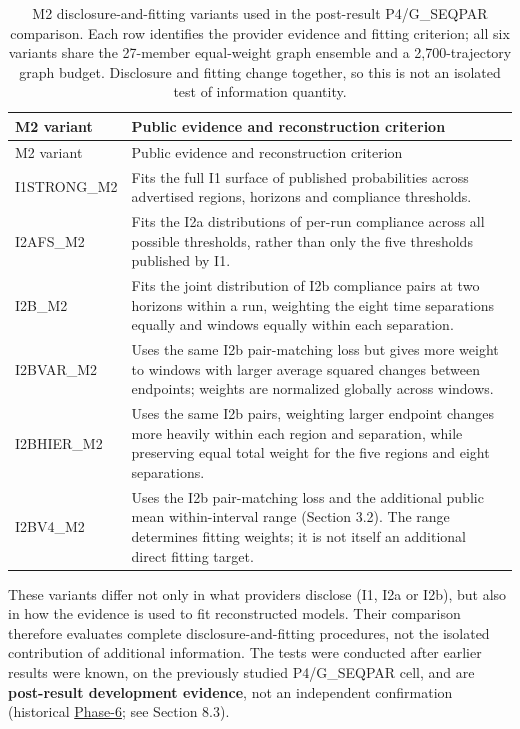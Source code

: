 \documentclass[10pt,a4paper]{article}
\begin{document}
\begingroup
\footnotesize
\setlength{\tabcolsep}{3pt}
\begin{longtable}{@{}p{}p{}@{}}
\caption{M2 disclosure-and-fitting variants used in the post-result P4/G\_SEQPAR comparison. Each row identifies the provider evidence and fitting criterion; all six variants share the 27-member equal-weight graph ensemble and a 2,700-trajectory graph budget. Disclosure and fitting change together, so this is not an isolated test of information quantity.}\label{tab:m2-variants}\\
\toprule
M2 variant & Public evidence and reconstruction criterion \\
\midrule
\endfirsthead
\toprule
M2 variant & Public evidence and reconstruction criterion \\
\midrule
\endhead
I1STRONG\_M2 & Fits the full I1 surface of published probabilities across advertised regions, horizons and compliance thresholds. \\
I2AFS\_M2 & Fits the I2a distributions of per-run compliance across all possible thresholds, rather than only the five thresholds published by I1. \\
I2B\_M2 & Fits the joint distribution of I2b compliance pairs at two horizons within a run, weighting the eight time separations equally and windows equally within each separation. \\
I2BVAR\_M2 & Uses the same I2b pair-matching loss but gives more weight to windows with larger average squared changes between endpoints; weights are normalized globally across windows. \\
I2BHIER\_M2 & Uses the same I2b pairs, weighting larger endpoint changes more heavily within each region and separation, while preserving equal total weight for the five regions and eight separations. \\
I2BV4\_M2 & Uses the I2b pair-matching loss and the additional public mean within-interval range (Section 3.2). The range determines fitting weights; it is not itself an additional direct fitting target. \\
\bottomrule
\end{longtable}
\endgroup

These variants differ not only in what providers disclose (I1, I2a or I2b), but also in how the evidence is used to fit reconstructed models. Their comparison therefore evaluates complete disclosure-and-fitting procedures, not the isolated contribution of additional information. The tests were conducted after earlier results were known, on the previously studied P4/G\_SEQPAR cell, and are \textbf{post-result development evidence}, not an independent confirmation (historical \hyperref[app:experiment-stages]{Phase-6}; see Section 8.3).
\end{document}
